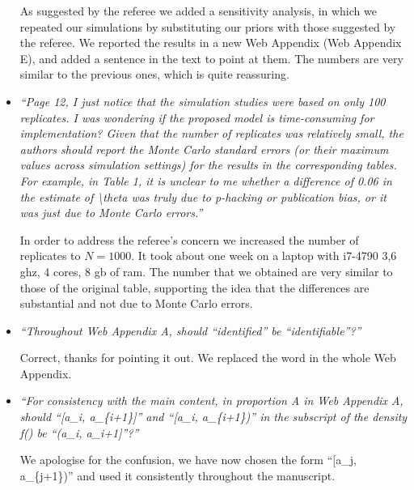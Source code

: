 \documentclass[11pt]{article}
\begin{document}
\begin{itemize}
As suggested by the referee we added a sensitivity analysis, in which we repeated our simulations by substituting our priors with those suggested by the referee. We reported the results in a new Web Appendix (Web Appendix E), and added a sentence in the text to point at them. The numbers are very similar to the previous ones, which is quite reassuring.\\


\item \emph{``Page 12, I just notice that the simulation studies were based on only 100 replicates. I was wondering if the proposed model is time-consuming for implementation? Given that the number of replicates was relatively small, the authors should report the Monte Carlo standard errors (or their maximum values across simulation settings) for the results in the corresponding tables. For example, in Table 1, it is unclear to me whether a difference of 0.06 in the estimate of \textbackslash theta was truly due to p-hacking or publication bias, or it was just due to Monte Carlo errors.''}

In order to address the referee's concern we increased the number of replicates to $N=1000$. It took about one week on a laptop with i7-4790 3,6 ghz, 4 cores, 8 gb of ram. The number that we obtained are very similar to those of the original table, supporting the idea that the differences are substantial and not due to Monte Carlo errors. \\


\item \emph{``Throughout Web Appendix A, should “identified” be “identifiable”?''}

Correct, thanks for pointing it out. We replaced the word in the whole Web Appendix. \\


\item \emph{``For consistency with the main content, in proportion A in Web Appendix A, should ``[a\_i, a\_\{i+1\}]'' and ``[a\_i, a\_\{i+1\})'' in the subscript of the density f() be ``(a\_i, a\_{i+1}]''?''}

We apologise for the confusion, we have now chosen the form ``[a\_j, a\_\{j+1\})'' and used it consistently throughout the manuscript.

\end{itemize}
\end{document}
